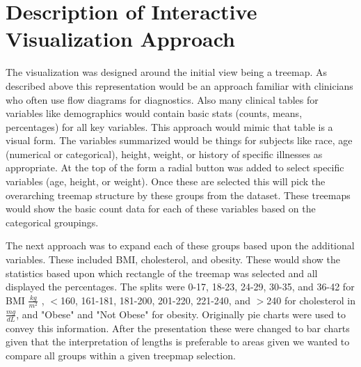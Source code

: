\documentclass[12pt]{article}
\numberwithin{figure}{section}
\begin{document}
\newpage


{\section{Description of Interactive Visualization Approach}}
The visualization was designed around the initial view being a treemap.  As described above this representation would be an approach familiar with clinicians who often use flow diagrams for diagnostics.  Also many clinical tables for variables like demographics would contain basic stats (counts, means, percentages) for all key variables.  This approach would mimic that table is a visual form.  The variables summarized would be things for subjects like race, age (numerical or categorical), height, weight, or history of specific illnesses as appropriate.  At the top of the form a radial button was added to select specific variables (age, height, or weight).  Once these are selected this will pick the overarching treemap structure by these groups from the dataset.  These treemaps would show the basic count data for each of these variables based on the categorical groupings.

The next approach was to expand each of these groups based upon the additional variables.  These included BMI, cholesterol, and obesity.  These would show the statistics based upon which rectangle of the treemap was selected and all displayed the percentages.  The splits were 0-17, 18-23, 24-29, 30-35, and 36-42 for BMI $\frac{kg}{m^2}$ , $<$160, 161-181, 181-200, 201-220, 221-240, and $>$240 for cholesterol in $\frac{mg}{dL}$, and "Obese" and "Not Obese" for obesity.  Originally pie charts were used to convey this information.  After the presentation these were changed to bar charts given that the interpretation of lengths is preferable to areas given we wanted to compare all groups within a given treepmap selection.
\end{document}
